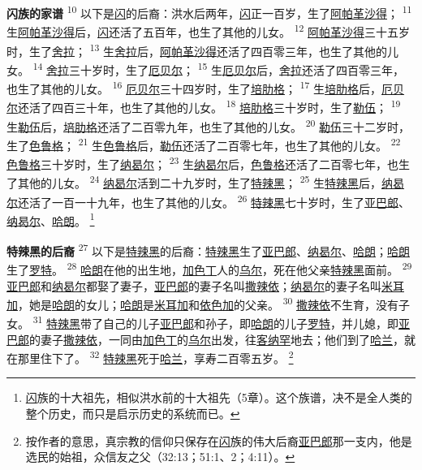 \textbf{闪族的家谱\quad}
\textsuperscript{10}
以下是\uline{闪}的后裔：洪水后两年，\uline{闪}正一百岁，生了\uline{阿帕革}\uline{沙得}；
\textsuperscript{11}
生\uline{阿帕革}\uline{沙得}后，\uline{闪}还活了五百年，也生了其他的儿女。
\textsuperscript{12}
\uline{阿帕革}\uline{沙得}三十五岁时，生了\uline{舍拉}；
\textsuperscript{13}
生\uline{舍拉}后，\uline{阿帕革}\uline{沙得}还活了四百零三年，也生了其他的儿女。
\textsuperscript{14}
\uline{舍拉}三十岁时，生了\uline{厄贝尔}；
\textsuperscript{15}
生\uline{厄贝尔}后，\uline{舍拉}还活了四百零三年，也生了其他的儿女。
\textsuperscript{16}
\uline{厄贝尔}三十四岁时，生了\uline{培肋格}；
\textsuperscript{17}
生\uline{培肋格}后，\uline{厄贝尔}还活了四百三十年，也生了其他的儿女。
\textsuperscript{18}
\uline{培肋格}三十岁时，生了\uline{勒伍}；
\textsuperscript{19}
生\uline{勒伍}后，\uline{培肋格}还活了二百零九年，也生了其他的儿女。
\textsuperscript{20}
\uline{勒伍}三十二岁时，生了\uline{色鲁格}；
\textsuperscript{21}
生\uline{色鲁格}后，\uline{勒伍}还活了二百零七年，也生了其他的儿女。
\textsuperscript{22}
\uline{色鲁格}三十岁时，生了\uline{纳曷尔}；
\textsuperscript{23}
生\uline{纳曷尔}后，\uline{色鲁格}还活了二百零七年，也生了其他的儿女。
\textsuperscript{24}
\uline{纳曷尔}活到二十九岁时，生了\uline{特辣黑}；
\textsuperscript{25}
生\uline{特辣黑}后，\uline{纳曷尔}还活了一百一十九年，也生了其他的儿女。
\textsuperscript{26}
\uline{特辣黑}七十岁时，生了\uline{亚巴郎}、\uline{纳曷尔}、\uline{哈朗}。
\footnote{\uline{闪}族的十大祖先，相似洪水前的十大祖先（5章）。这个族谱，决不是全人类的整个历史，而只是启示历史的系统而已。}

\textbf{特辣黑的后裔\quad}
\textsuperscript{27}
以下是\uline{特辣黑}的后裔：\uline{特辣黑}生了\uline{亚巴郎}、\uline{纳曷尔}、\uline{哈朗}；\uline{哈朗}生了\uline{罗特}。
\textsuperscript{28}
\uline{哈朗}在他的出生地，\uline{加色丁}人的\uline{乌尔}，死在他父亲\uline{特辣黑}面前。
\textsuperscript{29}
\uline{亚巴郎}和\uline{纳曷尔}都娶了妻子，\uline{亚巴郎}的妻子名叫\uline{撒辣依}；\uline{纳曷尔}的妻子名叫\uline{米耳加}，她是\uline{哈朗}的女儿；\uline{哈朗}是\uline{米耳加}和\uline{依色加}的父亲。
\textsuperscript{30}
\uline{撒辣依}不生育，没有子女。
\textsuperscript{31}
\uline{特辣黑}带了自己的儿子\uline{亚巴郎}和孙子，即\uline{哈朗}的儿子\uline{罗特}，并儿媳，即\uline{亚巴郎}的妻子\uline{撒辣依}，一同由\uline{加色丁}的\uline{乌尔}出发，往\uline{客纳罕}地去；他们到了\uline{哈兰}，就在那里住下了。
\textsuperscript{32}
\uline{特辣黑}死于\uline{哈兰}，享寿二百零五岁。
\footnote{按作者的意思，真宗教的信仰只保存在\uline{闪}族的伟大后裔\uline{亚巴郎}那一支内，他是选民的始祖，众信友之父（32:13；51:1、2；4:11）。}

